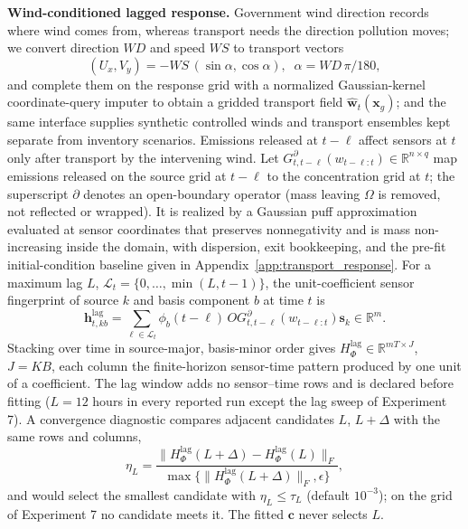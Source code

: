 \noindent\textbf{Wind-conditioned lagged response.}\label{subsec:wind_field_estimation}
Government wind direction records where wind comes from, whereas transport needs
the direction pollution moves; we convert direction \(\mathit{WD}\) and speed
\(\mathit{WS}\) to transport vectors
\begin{equation}
(U_x,V_y)=-\mathit{WS}\,(\sin\alpha,\cos\alpha),\;\;
\alpha=\mathit{WD}\,\pi/180,
\label{eq:wind_direction_conversion}
\end{equation}
and complete them on the response grid with a normalized Gaussian-kernel
coordinate-query imputer to obtain a gridded transport field
\(\widehat{\mathbf w}_t(\mathbf x_g)\); and the same interface
supplies synthetic controlled winds and transport ensembles kept separate from
inventory scenarios.  Emissions released at \(t-\ell\) affect sensors at \(t\)
only after transport by the intervening wind.  Let
\(G_{t,t-\ell}^{\partial}(w_{t-\ell:t})\in \mathbb R^{n\times q}\) map emissions
released on the source grid at \(t-\ell\) to the concentration grid at \(t\); the
superscript \(\partial\) denotes an open-boundary operator (mass leaving
\(\Omega\) is removed, not reflected or wrapped).\label{subsec:plume_response} It
is realized by a Gaussian puff approximation evaluated at sensor coordinates that
preserves nonnegativity and is mass non-increasing inside the domain, with
dispersion, exit bookkeeping, and the pre-fit initial-condition baseline given in
Appendix~\ref{app:transport_response}.  For a maximum lag \(L\),
\(\mathcal L_t=\{0,\ldots,\min(L,t-1)\}\), the unit-coefficient sensor fingerprint
of source \(k\) and basis component \(b\) at time \(t\) is
\begin{equation}
\mathbf h_{t,kb}^{\mathrm{lag}}
= \sum_{\ell\in\mathcal L_t}
\phi_b(t-\ell)\,O G_{t,t-\ell}^{\partial}(w_{t-\ell:t})\mathbf s_k
\in \mathbb R^m.
\label{eq:constructed_response}
\end{equation}
Stacking over time in source-major, basis-minor order gives
\(H_{\Phi}^{\mathrm{lag}}\in \mathbb R^{mT\times J}\), \(J=KB\), each column the
finite-horizon sensor-time pattern produced by one unit of a coefficient.  The lag
window adds no sensor--time rows and is declared before fitting (\(L=12\) hours in every
reported run except the lag sweep of Experiment 7).  A convergence diagnostic compares
adjacent candidates \(L\), \(L+\Delta\) with the
same rows and columns,
\begin{equation}
\eta_L=
\frac{\|H_{\Phi}^{\mathrm{lag}}(L+\Delta)
-H_{\Phi}^{\mathrm{lag}}(L)\|_F}
{\max\{\|H_{\Phi}^{\mathrm{lag}}(L+\Delta)\|_F,\epsilon\}},
\label{eq:lag_convergence}
\end{equation}
and would select the smallest candidate with \(\eta_L\le\tau_L\) (default
\(10^{-3}\)); on the grid of Experiment 7 no candidate meets it.  The fitted
\(\mathbf c\) never selects \(L\).

